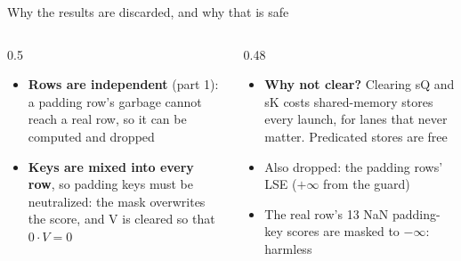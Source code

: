 \documentclass[aspectratio=169,11pt]{beamer}
\newcommand{\NaN}{NaN}
\begin{document}
\begin{frame}{Why the results are discarded, and why that is safe}
\centering
{}
\vspace{3mm}
\begin{columns}[T]
\begin{column}{0.5\textwidth}
\small
\begin{itemize}
\item \textbf{Rows are independent} (part 1): a padding row's garbage cannot reach a real row, so it can be computed and dropped
\item \textbf{Keys are mixed into every row}, so padding keys must be neutralized: the mask overwrites the score, and V is cleared so that $0\cdot V=0$
\end{itemize}
\end{column}
\begin{column}{0.48\textwidth}
\small
\begin{itemize}
\item \textbf{Why not clear?} Clearing sQ and sK costs shared-memory stores every launch, for lanes that never matter. Predicated stores are free
\item Also dropped: the padding rows' LSE ($+\infty$ from the guard)
\item The real row's 13 \NaN{} padding-key scores are masked to $-\infty$: harmless
\end{itemize}
\end{column}
\end{columns}
\end{frame}
\end{document}

